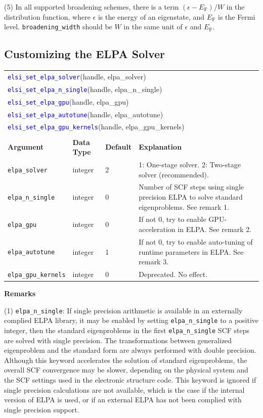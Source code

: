 \documentclass{report}
\newcommand{\api}[1]{\textcolor{blue}{\texttt{#1}}}
\begin{document}
(5) In all supported broadening schemes, there is a term $(\epsilon - E_\text{F})/W$ in the distribution function, where $\epsilon$ is the energy of an eigenstate, and $E_\text{F}$ is the Fermi level. \texttt{broadening\_width} should be $W$ in the same unit of $\epsilon$ and $E_\text{F}$.

\subsection{Customizing the ELPA Solver}
\label{subsec:setter_elpa}
\begin{tabular}[]{|p{30mm}|p{20mm}|p{15mm}|p{97mm}|}
\multicolumn{4}{l}{\api{elsi\_set\_elpa\_solver}(handle, elpa\_solver)}\\
\multicolumn{4}{l}{\api{elsi\_set\_elpa\_n\_single}(handle, elpa\_n\_single)}\\
\multicolumn{4}{l}{\api{elsi\_set\_elpa\_gpu}(handle, elpa\_gpu)}\\
\multicolumn{4}{l}{\api{elsi\_set\_elpa\_autotune}(handle, elpa\_autotune)}\\
\multicolumn{4}{l}{\api{elsi\_set\_elpa\_gpu\_kernels}(handle, elpa\_gpu\_kernels)}\\
\multicolumn{4}{l}{}\\
\hline
\multicolumn{1}{|l|}{\textbf{Argument}} & \multicolumn{1}{l|}{\textbf{Data Type}} & \multicolumn{1}{l|}{\textbf{Default}} & \multicolumn{1}{l|}{\textbf{Explanation}}\\
\hline
\texttt{elpa\_solver}       & integer & 2 & 1: One-stage solver. 2: Two-stage solver (recommended).\\
\hline
\texttt{elpa\_n\_single}    & integer & 0 & Number of SCF steps using single precision ELPA to solve standard eigenproblems. See remark 1.\\
\hline
\texttt{elpa\_gpu}          & integer & 0 & If not 0, try to enable GPU-acceleration in ELPA. See remark 2.\\
\hline
\texttt{elpa\_autotune}     & integer & 1 & If not 0, try to enable auto-tuning of runtime parameters in ELPA. See remark 3.\\
\hline
\texttt{elpa\_gpu\_kernels} & integer & 0 & Deprecated. No effect.\\
\hline
\end{tabular}

\textbf{Remarks}

(1) \texttt{elpa\_n\_single}: If single precision arithmetic is available in an externally complied ELPA library, it may be enabled by setting \texttt{elpa\_n\_single} to a positive integer, then the standard eigenproblems in the first \texttt{elpa\_n\_single} SCF steps are solved with single precision. The transformations between generalized eigenproblem and the standard form are always performed with double precision. Although this keyword accelerates the solution of standard eigenproblems, the overall SCF convergence may be slower, depending on the physical system and the SCF settings used in the electronic structure code. This keyword is ignored if single precision calculations are not available, which is the case if the internal version of ELPA is used, or if an external ELPA has not been complied with single precision support.
\end{document}

